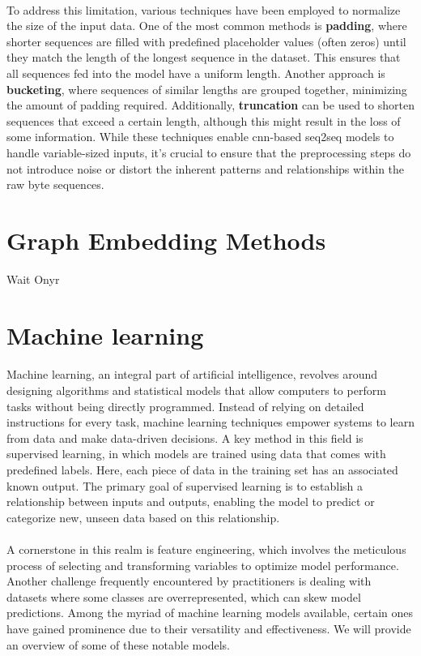         \paragraph{}To address this limitation, various techniques have been employed to normalize the size of the input data. One of the most common methods is \textbf{padding}, where shorter sequences are filled with predefined placeholder values (often zeros) until they match the length of the longest sequence in the dataset. This ensures that all sequences fed into the model have a uniform length. Another approach is \textbf{bucketing}, where sequences of similar lengths are grouped together, minimizing the amount of padding required. Additionally, \textbf{truncation} can be used to shorten sequences that exceed a certain length, although this might result in the loss of some information. While these techniques enable \acrshort{cnn}-based \acrfull{seq2seq} models to handle variable-sized inputs, it's crucial to ensure that the preprocessing steps do not introduce noise or distort the inherent patterns and relationships within the raw byte sequences.
\section{Graph Embedding Methods}
    Wait Onyr

\section{Machine learning}\label{seq:background:machine_learning}
    \paragraph{}Machine learning, an integral part of artificial intelligence, revolves around designing algorithms and statistical models that allow computers to perform tasks without being directly programmed. Instead of relying on detailed instructions for every task, machine learning techniques empower systems to learn from data and make data-driven decisions. A key method in this field is supervised learning, in which models are trained using data that comes with predefined labels. Here, each piece of data in the training set has an associated known output. The primary goal of supervised learning is to establish a relationship between inputs and outputs, enabling the model to predict or categorize new, unseen data based on this relationship.

    \paragraph{}A cornerstone in this realm is feature engineering, which involves the meticulous process of selecting and transforming variables to optimize model performance. Another challenge frequently encountered by practitioners is dealing with datasets where some classes are overrepresented, which can skew model predictions. Among the myriad of machine learning models available, certain ones have gained prominence due to their versatility and effectiveness. We will provide an overview of some of these notable models.


